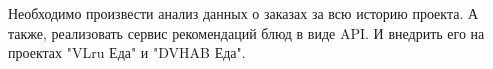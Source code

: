 Необходимо произвести анализ данных о заказах за всю историю проекта. А также,
реализовать сервис рекомендаций блюд в виде API. И внедрить его на проектах
"VLru Еда" и "DVHAB Еда".

